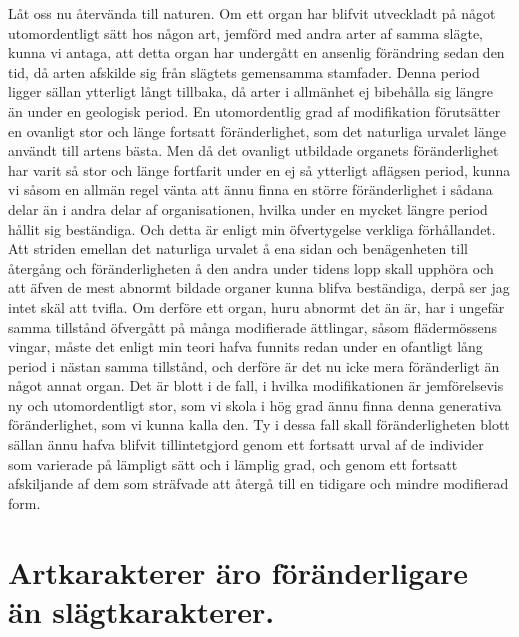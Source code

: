 Låt oss nu återvända till naturen. Om ett organ har blifvit utveckladt på något utomordentligt sätt hos någon art, jemförd med andra arter af samma slägte, kunna vi antaga, att detta organ har undergått en ansenlig förändring sedan den tid, då arten afskilde sig från slägtets gemensamma stamfader. Denna period ligger sällan ytterligt långt tillbaka, då arter i allmänhet ej bibehålla sig längre än under en geologisk period. En utomordentlig grad af modifikation förutsätter en ovanligt stor och länge fortsatt föränderlighet, som det naturliga urvalet länge användt till artens bästa. Men då det ovanligt utbildade organets föränderlighet har varit så stor och länge fortfarit under en ej så ytterligt aflägsen period, kunna vi såsom en allmän regel vänta att ännu finna en större föränderlighet i sådana delar än i andra delar af organisationen, hvilka under en mycket längre period hållit sig beständiga. Och detta är enligt min öfvertygelse verkliga förhållandet. Att striden emellan det naturliga urvalet å ena sidan och benägenheten till återgång och föränderligheten å den andra under tidens lopp skall upphöra och att äfven de mest abnormt bildade organer kunna blifva beständiga, derpå ser jag intet skäl att tvifla. Om derföre ett organ, huru abnormt det än är, har i ungefär samma tillstånd öfvergått på många modifierade ättlingar, såsom flädermössens vingar, måste det enligt min teori hafva funnits redan under en ofantligt lång period i nästan samma tillstånd, och derföre är det nu icke mera föränderligt än något annat organ. Det är blott i de fall, i hvilka modifikationen är jemförelsevis ny och utomordentligt stor, som vi skola i hög grad ännu finna denna generativa föränderlighet, som vi kunna kalla den. Ty i dessa fall skall föränderligheten blott sällan ännu hafva blifvit tillintetgjord genom ett fortsatt urval af de individer som varierade på lämpligt sätt och i lämplig grad, och genom ett fortsatt afskiljande af dem som sträfvade att återgå till en tidigare och mindre modifierad form.



\section[Artkaraktarer äro föränderligare]{Artkarakterer äro föränderligare än slägtkarakterer.}

